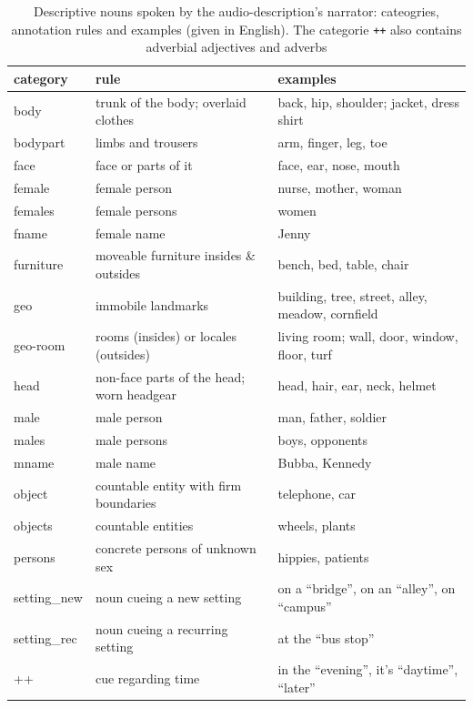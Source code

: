 \documentclass[english]{article}
\begin{document}

\begin{table}[t]
    \caption{Descriptive nouns spoken by the audio-description's narrator:
    cateogries, annotation rules and examples (given in English). The categorie
    \texttt{++} also contains adverbial adjectives and adverbs}
\label{tab:descr-nouns-rules}
\begin{tabular}{lll}
\toprule
\textbf{category} & \textbf{rule} & \textbf{examples} \\
\midrule
body & trunk of the body; overlaid clothes & back, hip, shoulder; jacket, dress
shirt \tabularnewline
bodypart & limbs and trousers & arm, finger, leg, toe \tabularnewline
face & face or parts of it & face, ear, nose, mouth \tabularnewline
female & female person & nurse, mother, woman \tabularnewline
females & female persons & women \tabularnewline
fname & female name & Jenny \tabularnewline
furniture & moveable furniture insides \& outsides & bench, bed, table, chair
\tabularnewline
geo & immobile landmarks & building, tree, street, alley, meadow, cornfield \tabularnewline
geo-room & rooms (insides) or  locales (outsides) & living room; wall, door, window, floor, turf \tabularnewline
head & non-face parts of the head; worn headgear & head, hair, ear, neck,
helmet \tabularnewline
male & male person & man, father, soldier \tabularnewline
males & male persons & boys, opponents \tabularnewline
mname & male name & Bubba, Kennedy \tabularnewline
object & countable entity with firm boundaries & telephone, car \tabularnewline
objects & countable entities & wheels, plants \tabularnewline
persons & concrete persons of unknown sex & hippies, patients \tabularnewline
setting\_new & noun cueing a new setting &  on a ``bridge'', on an ``alley'', on ``campus'' \tabularnewline
setting\_rec & noun cueing a recurring setting & at the ``bus stop'' \tabularnewline
++ & cue regarding time & in the ``evening'', it's ``daytime'', ``later'' \tabularnewline

\bottomrule
\end{tabular}
\end{table}
\end{document}
